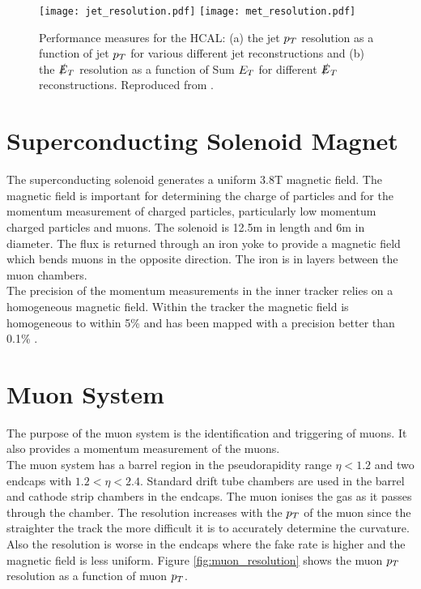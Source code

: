 \begin{figure}
\texttt{[image: jet\_resolution.pdf]}
\texttt{[image: met\_resolution.pdf]}
\caption{Performance measures for the HCAL: (a) the jet $p_{T}$ resolution as a 
function of jet $p_{T}$ for various different jet reconstructions and (b) the 
$\slashed{E}_{T}$ resolution as a function of Sum $E_{T}$ for different $\slashed{E}_{T}$
reconstructions. Reproduced from \cite{jet_resolution, met_resolution}.}
\label{fig:jetmet}
\end{figure}

\section{Superconducting Solenoid Magnet}

The superconducting solenoid generates a uniform 3.8T magnetic field. The 
magnetic field is important for determining the charge of particles and for the 
momentum measurement of charged particles, particularly low momentum charged 
particles and muons. The solenoid is 12.5m in length and 6m in diameter. The flux 
is returned through an iron yoke to provide a magnetic field which bends muons in 
the opposite direction. The iron is in layers between the muon chambers. \\

The precision of the momentum measurements in the inner tracker relies on a
homogeneous magnetic field. Within the tracker the magnetic field is homogeneous
to within 5\% \cite{field_measurement} and has been mapped with a precision 
better than 0.1\% \cite{field_uniformity}.

\section{Muon System}

The purpose of the muon system is the identification and triggering of muons. It
also provides a momentum measurement of the muons. \\

The muon system has a barrel region in the pseudorapidity range $\eta < 1.2$ and
two endcaps with $1.2 < \eta < 2.4$. Standard drift tube chambers are used in
the barrel and cathode strip chambers in the endcaps. The muon ionises the gas 
as it passes through the chamber. The resolution increases with the $p_{T}$ of the
muon since the straighter the track the more difficult it is to accurately 
determine the curvature. Also the resolution is worse in the endcaps where the
fake rate is higher and the magnetic field is less uniform. Figure
\ref{fig:muon_resolution} shows the muon $p_{T}$ resolution as a function of muon
$p_{T}$.

